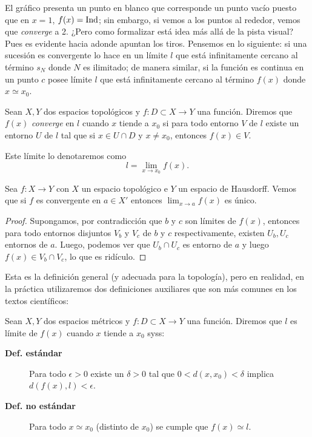 \documentclass[11pt,oneside,a4paper]{book}
\begin{document}
El gráfico presenta un punto en blanco que corresponde un punto vacío puesto que en $x=1$, $f(x)=\rm Ind$; sin embargo, si vemos a los puntos al rededor, vemos que \textit{converge} a 2. ¿Pero como formalizar está idea más allá de la pista visual? Pues es evidente hacia adonde apuntan los tiros. Pensemos en lo siguiente: si una sucesión es convergente lo hace en un límite $l$ que está infinitamente cercano al término $s_N$ donde $N$ es ilimitado; de manera similar, si la función es continua en un punto $c$ posee límite $l$ que está infinitamente cercano al término $f(x)$ donde $x\simeq x_0$.
\begin{mydef}
Sean $X,Y$ dos espacios topológicos y $f:D\subset X\rightarrow Y$ una función. Diremos que $f(x)$ \textit{converge} en $l$ cuando $x$ tiende a $x_0$ si para todo entorno $V$ de $l$ existe un entorno $U$ de $l$ tal que si $x\in U\cap D$ y $x\neq x_0$, entonces $f(x)\in V$.

Este límite lo denotaremos como
$$l=\lim_{x\to x_0} f(x).$$
\end{mydef}
\begin{thm}
Sea $f:X\rightarrow Y$ con $X$ un espacio topológico e $Y$ un espacio de Hausdorff. Vemos que si $f$ es convergente en $a\in X'$ entonces $\lim_{x\to a}f(x)$ es único.
\end{thm}
\begin{proof}
Supongamos, por contradicción que $b$ y $c$ son límites de $f(x)$, entonces para todo entornos disjuntos $V_b$ y $V_c$ de $b$ y $c$ respectivamente, existen $U_b,U_c$ entornos de $a$. Luego, podemos ver que $U_b\cap U_c$ es entorno de $a$ y luego $f(x)\in V_b\cap V_c$, lo que es ridículo.
\end{proof}
Esta es la definición general (y adecuada para la topología), pero en realidad, en la práctica utilizaremos dos definiciones auxiliares que son más comunes en los textos científicos:
\begin{thm}
Sean $X,Y$ dos espacios métricos y $f:D\subset X\rightarrow Y$ una función. Diremos que $l$ es límite de $f(x)$ cuando $x$ tiende a $x_0$ syss:
	\begin{description}
	\item[\bf Def. estándar] Para todo $\epsilon\gt 0$ existe un $\delta\gt 0$ tal que $0\lt d(x,x_0)\lt\delta$ implica $d(f(x),l)\lt\epsilon$.
	\item[\bf Def. no estándar] Para todo $x\simeq x_0$ (distinto de $x_0$) se cumple que $f(x)\simeq l$.
	\end{description}
\end{thm}
\end{document}
